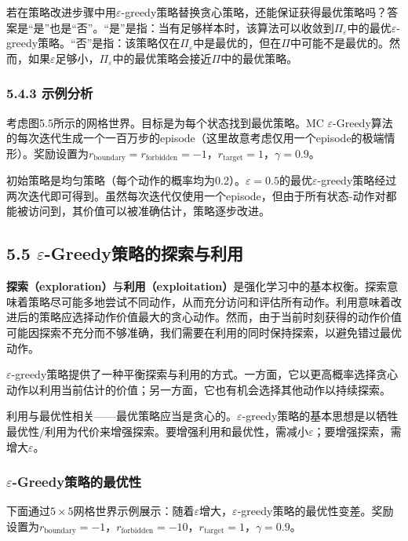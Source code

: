 \documentclass[UTF8]{article}
\begin{document}
若在策略改进步骤中用$\varepsilon$-greedy策略替换贪心策略，还能保证获得最优策略吗？答案是“是”也是“否”。“是”是指：当有足够样本时，该算法可以收敛到$\Pi_\varepsilon$中的最优$\varepsilon$-greedy策略。“否”是指：该策略仅在$\Pi_\varepsilon$中是最优的，但在$\Pi$中可能不是最优的。然而，如果$\varepsilon$足够小，$\Pi_\varepsilon$中的最优策略会接近$\Pi$中的最优策略。

\subsubsection*{5.4.3 示例分析}

考虑图5.5所示的网格世界。目标是为每个状态找到最优策略。MC $\varepsilon$-Greedy算法的每次迭代生成一个一百万步的episode（这里故意考虑仅用一个episode的极端情形）。奖励设置为$r_{\text{boundary}} = r_{\text{forbidden}} = -1$，$r_{\text{target}} = 1$，$\gamma = 0.9$。

初始策略是均匀策略（每个动作的概率均为0.2）。$\varepsilon = 0.5$的最优$\varepsilon$-greedy策略经过两次迭代即可得到。虽然每次迭代仅使用一个episode，但由于所有状态-动作对都能被访问到，其价值可以被准确估计，策略逐步改进。

\subsection*{5.5 $\varepsilon$-Greedy策略的探索与利用}

\textbf{探索（exploration）}与\textbf{利用（exploitation）}是强化学习中的基本权衡。探索意味着策略尽可能多地尝试不同动作，从而充分访问和评估所有动作。利用意味着改进后的策略应选择动作价值最大的贪心动作。然而，由于当前时刻获得的动作价值可能因探索不充分而不够准确，我们需要在利用的同时保持探索，以避免错过最优动作。

$\varepsilon$-greedy策略提供了一种平衡探索与利用的方式。一方面，它以更高概率选择贪心动作以利用当前估计的价值；另一方面，它也有机会选择其他动作以持续探索。

利用与最优性相关——最优策略应当是贪心的。$\varepsilon$-greedy策略的基本思想是以牺牲最优性/利用为代价来增强探索。要增强利用和最优性，需减小$\varepsilon$；要增强探索，需增大$\varepsilon$。

\subsubsection*{$\varepsilon$-Greedy策略的最优性}

下面通过$5 \times 5$网格世界示例展示：随着$\varepsilon$增大，$\varepsilon$-greedy策略的最优性变差。奖励设置为$r_{\text{boundary}} = -1$，$r_{\text{forbidden}} = -10$，$r_{\text{target}} = 1$，$\gamma = 0.9$。
\end{document}
